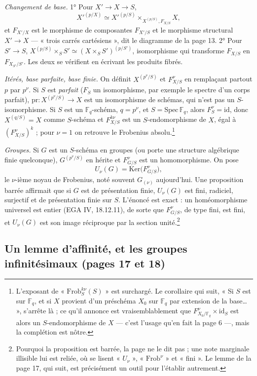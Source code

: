 \documentclass[11pt,a4paper]{article}
\begin{document}
\emph{Changement de base.} 1° Pour $X' \to X \to S$,
\[
X'^{(p/X)} \simeq X'^{(p/S)} \times_{X^{(p/S)}, F_{X/S}} X,
\]
et $F_{X'/X}$ est le morphisme de composantes $F_{X'/S}$ et le morphisme
structural $X' \to X$ — « trois carrés cartésiens », dit le diagramme de la
page 13. 2° Pour $S' \to S$, $X^{(p/S)} \times_S S' \simeq (X \times_S
S')^{(p/S')}$, isomorphisme qui transforme $F_{X/S}$ en $F_{X_{S'}/S'}$. Les
deux se vérifient en écrivant les produits fibrés.

\emph{Itérés, base parfaite, base finie.} On définit $X^{(p^{\nu}/S)}$ et
$F^{\nu}_{X/S}$ en remplaçant partout $p$ par $p^{\nu}$. Si $S$ est
\emph{parfait} ($F_S$ un isomorphisme, par exemple le spectre d'un corps
parfait), $\mathrm{pr} : X^{(p^{\nu}/S)} \to X$ est un isomorphisme de
schémas, qui n'est pas un $S$-isomorphisme. Si $S$ est un $\mathbb{F}_q$-schéma,
$q = p^{\nu}$, et $S = \mathrm{Spec}\,\mathbb{F}_q$, alors $F_S^{\nu} =
\mathrm{id}$, donc $X^{(q/S)} = X$ comme $S$-schéma et $F^{k\nu}_{X/S}$ est un
$S$-endomorphisme de $X$, égal à $(F^{\nu}_{X/S})^{k}$ ; pour $\nu = 1$ on
retrouve le Frobenius absolu.\footnote{L'exposant de « $\mathrm{Frob}^{k\nu}_S(S)$ »
est surchargé. Le corollaire qui suit, « Si $S$ est sur $\mathbb{F}_q$, et si
$X$ provient d'un préschéma $X_0$ sur $\mathbb{F}_q$ par extension de la
base… », s'arrête là ; ce qu'il annonce est vraisemblablement que
$F^{\nu}_{X_0/\mathbb{F}_q} \times \mathrm{id}_S$ est alors un
$S$-endomorphisme de $X$ — c'est l'usage qu'en fait la page 6 —, mais la
complétion est nôtre.}

\emph{Groupes.} Si $G$ est un $S$-schéma en groupes (ou porte une structure
algébrique finie quelconque), $G^{(p^{\nu}/S)}$ en hérite et $F^{\nu}_{G/S}$
est un homomorphisme. On pose
\[
U_{\nu}(G) = \mathrm{Ker}\bigl(F^{\nu}_{G/S}\bigr),
\]
le $\nu$-ième noyau de Frobenius, noté souvent $G_{(\nu)}$ aujourd'hui. Une
proposition barrée affirmait que si $G$ est de présentation finie, $U_{\nu}(G)$
est fini, radiciel, surjectif et de présentation finie sur $S$. L'énoncé est
exact : un homéomorphisme universel est entier (EGA IV, 18.12.11), de sorte que
$F^{\nu}_{G/S}$, de type fini, est fini, et $U_{\nu}(G)$ est son image
réciproque par la section unité.\footnote{Pourquoi la proposition est barrée,
la page ne le dit pas ; une note marginale illisible lui est reliée, où se
lisent « $U_{\nu}$ », « $\mathrm{Frob}^{\nu}$ » et « fini ». Le lemme de la
page 17, qui suit, est précisément un outil pour l'établir autrement.}

\subsection*{Un lemme d'affinité, et les groupes infinitésimaux (pages 17 et 18)}
\end{document}
